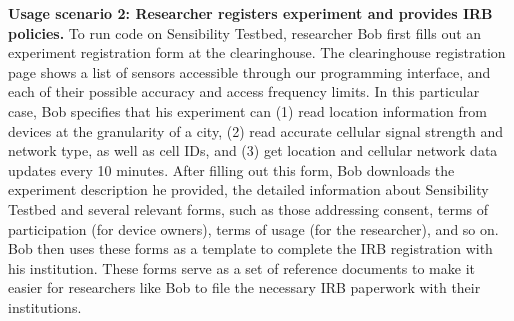 \textbf{Usage scenario 2: Researcher registers experiment and provides IRB policies.}
To run code on Sensibility Testbed, researcher Bob first 
fills out an experiment
registration form  at the 
clearinghouse. The clearinghouse registration page shows 
a list of sensors accessible through our programming interface, and 
each of their possible accuracy and access frequency limits. 
In this particular case, Bob specifies that 
his experiment can (1) read location information
from devices at the granularity of a city, (2) read accurate
cellular signal strength and network type, as well as
cell IDs, and (3) get location and
cellular network data updates every 10 minutes. 
%
After filling out this form, Bob downloads the experiment description 
he provided, the detailed information about Sensibility Testbed and 
several relevant forms, such as 
those addressing consent, terms of participation (for device owners),  
terms of usage (for the researcher), and so on.   
Bob then uses these forms as a template to complete the IRB registration 
with his institution. These forms serve as a set of reference documents 
to make it easier for researchers like Bob to 
file the necessary IRB paperwork with their institutions.

